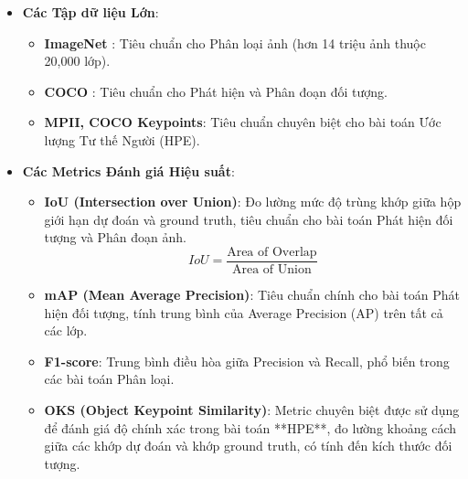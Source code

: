 \begin{itemize}
    \item \textbf{Các Tập dữ liệu Lớn}:
    \begin{itemize}
        \item \textbf{ImageNet} \cite{deng2009imagenet}: Tiêu chuẩn cho Phân loại ảnh (hơn 14 triệu ảnh thuộc 20,000 lớp).
        \item \textbf{COCO} \cite{lin2014microsoft}: Tiêu chuẩn cho Phát hiện và Phân đoạn đối tượng.
        \item \textbf{MPII, COCO Keypoints}: Tiêu chuẩn chuyên biệt cho bài toán Ước lượng Tư thế Người (HPE).
    \end{itemize}
    \item \textbf{Các Metrics Đánh giá Hiệu suất}: 
    \begin{itemize}
        \item \textbf{IoU (Intersection over Union)}: Đo lường mức độ trùng khớp giữa hộp giới hạn dự đoán và ground truth, tiêu chuẩn cho bài toán Phát hiện đối tượng và Phân đoạn ảnh.
        $$ IoU = \frac{\text{Area of Overlap}}{\text{Area of Union}} $$
        \item \textbf{mAP (Mean Average Precision)}: Tiêu chuẩn chính cho bài toán Phát hiện đối tượng, tính trung bình của Average Precision (AP) trên tất cả các lớp.
        \item \textbf{F1-score}: Trung bình điều hòa giữa Precision và Recall, phổ biến trong các bài toán Phân loại.
        \item \textbf{OKS (Object Keypoint Similarity)}: Metric chuyên biệt được sử dụng để đánh giá độ chính xác trong bài toán **HPE**, đo lường khoảng cách giữa các khớp dự đoán và khớp ground truth, có tính đến kích thước đối tượng.
    \end{itemize}
\end{itemize}
